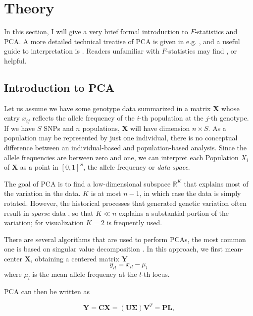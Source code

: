 \documentclass[12pt,fullpage, a4paper]{article}
\newcommand{\MX}{\mathbf{X}} %
\newcommand{\MC}{\mathbf{C}} %
\newcommand{\MY}{\mathbf{Y}} %
\newcommand{\MP}{\mathbf{P}} %
\newcommand{\ML}{\mathbf{L}} %
\newcommand{\MSINGULAR}{\mathbf{\Sigma}} %
\begin{document}
	
\section{Theory}
In this section, I will give a very brief formal introduction to $F$-statistics and PCA. A more detailed technical treatise of PCA is given in e.g. \cite{jolliffe2013}, and a useful guide to interpretation is \cite{cavalli-sforza1994}. Readers unfamiliar with $F$-statistics may find \cite{patterson2012}, \cite{peter2016} or \cite{oteo-garcia2021} helpful.

\subsection{Introduction to PCA}
Let us assume we have some genotype data summarized in a matrix $\MX$ whose entry $x_{ij}$ reflects the allele frequency of the $i$-th population at the $j$-th genotype. If we have $S$ SNPs and $n$ populations, $\MX$ will have dimension $n \times S$. As a population may be represented by just one individual, there is no conceptual difference between an individual-based and population-based analysis. Since the allele
frequencies are between zero and one, we can interpret each Population $X_i$
of $\MX$ as a point in $[0, 1]^S$, the allele frequency or \emph{data space}.
	
The goal of PCA is to find a low-dimensional subspace $\mathbb{R}^K$ that explains most of the variation in the data. $K$ is at most $n-1$, in which case the data is simply rotated. However, the  historical processes that generated genetic variation often result in \emph{sparse} data \citep{engelhardt2010}, so that $K \ll n$ explains a substantial portion of the variation; for visualization $K=2$ is frequently used. 
	
	
There are several algorithms that are used to perform PCAs, the most common one is based on singular value decomposition \citep{jolliffe2013}. In this approach, we first mean-center $\MX$, obtaining a centered matrix $\MY$
	\begin{equation*}
	y_{il} = x_{il} - \mu_l
	\end{equation*}
	where $\mu_l$ is the mean allele frequency at the $l$-th locus.
	
	PCA can then be written as
	
	\begin{equation}
	\MY = \MC\MX = (\mathbf{U} \MSINGULAR) \mathbf{V}^T = \MP\ML\text{,}
	\end{equation}
	
\end{document}
